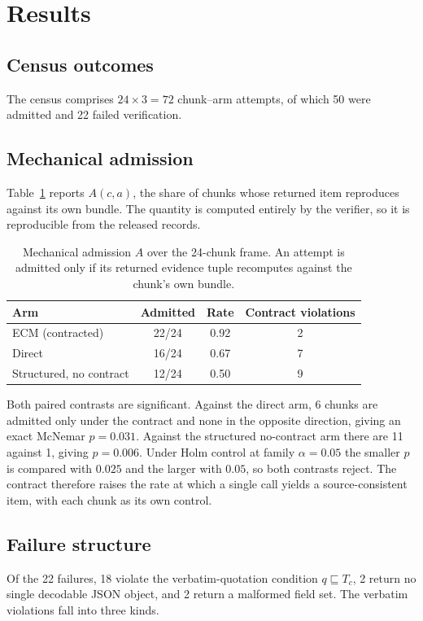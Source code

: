 \section{Results}
\label{sec:results}

\subsection{Census outcomes}
The census comprises $24\times3=72$ chunk--arm attempts, of which
50 were admitted and 22 failed verification.

\subsection{Mechanical admission}
\label{sec:admission}
Table~\ref{tab:admission} reports $A(c,a)$, the share of chunks whose
returned item reproduces against its own bundle. The quantity is
computed entirely by the verifier, so it is reproducible from the
released records.

\begin{table}[!t]
\caption{Mechanical admission $A$ over the 24-chunk frame. An attempt
is admitted only if its returned evidence tuple recomputes against the
chunk's own bundle.}
\label{tab:admission}
\centering
\begin{tabular}{lccc}
\toprule
Arm & Admitted & Rate & Contract violations \\
\midrule
ECM (contracted)      & 22/24 & 0.92 & 2 \\
Direct                & 16/24 & 0.67 & 7 \\
Structured, no contract & 12/24 & 0.50 & 9 \\
\bottomrule
\end{tabular}
\end{table}

Both paired contrasts are significant. Against the direct arm, 6
chunks are admitted only under the contract and none in the opposite
direction, giving an exact McNemar $p=0.031$. Against the structured
no-contract arm there are 11 against 1, giving $p=0.006$. Under Holm
control at family $\alpha=0.05$ the smaller $p$ is compared with
$0.025$ and the larger with $0.05$, so both contrasts reject. The
contract therefore raises the rate at which a single call yields a
source-consistent item, with each chunk as its own control.

\subsection{Failure structure}
\label{sec:failures}
Of the 22 failures, 18 violate the verbatim-quotation condition
$q\sqsubseteq T_c$, 2 return no single decodable JSON object, and 2
return a malformed field set. The verbatim violations fall into three
kinds.

